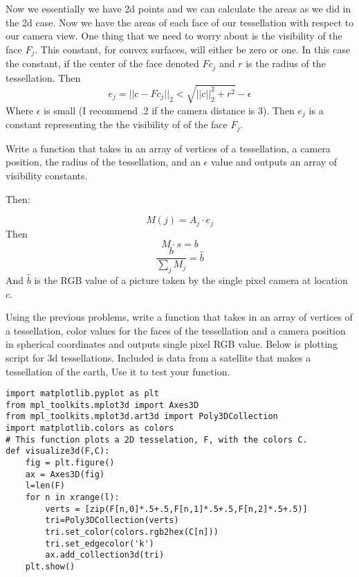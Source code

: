 Now we essentially we have 2d points and we can calculate the areas as we did in the 2d case. Now we have the areas of each face of our tessellation with respect to our camera view. One thing that we need to worry about is the visibility of the face $F_j$. This constant, for convex surfaces, will either be zero or one. In this case the constant, if the center of the face denoted $Fc_j$ and $r$ is the radius of the tessellation. Then
\[
e_j=||c-Fc_j||_2<\sqrt{||c||_2^2+r^2}-\epsilon
\] 
Where $\epsilon$ is small (I recommend .2 if the camera distance is 3).
Then $e_j$ is a constant representing the  the visibility of of the face $F_j$.

\begin{problem}
Write a function that takes in an array of vertices of a tessellation, a camera position, the radius of the tessellation, and an $\epsilon$ value and outputs an array of visibility constants.
\end{problem}
Then:

\begin{equation}
M(j) = A_j \cdot e_j
\end{equation}
Then
\begin{equation}
M \cdot s = b
\end{equation}
\begin{equation}
\frac{b}{\sum_j M_j} = \hat{b}
\end{equation}
And $\hat{b}$ is the RGB value of a picture taken by the single pixel camera at location $c$.

\begin{problem}
Using the previous problems, write a function that takes in an array of vertices of a tessellation, color values for the faces of the tessellation and a camera position in spherical coordinates and outputs single pixel RGB value. Below is plotting script for 3d tessellations. Included is data from a satellite that makes a tessellation of the earth, Use it to test your function.
\end{problem}

\begin{lstlisting}
import matplotlib.pyplot as plt
from mpl_toolkits.mplot3d import Axes3D
from mpl_toolkits.mplot3d.art3d import Poly3DCollection
import matplotlib.colors as colors
# This function plots a 2D tesselation, F, with the colors C. 
def visualize3d(F,C):
    fig = plt.figure()
    ax = Axes3D(fig)
    l=len(F)
    for n in xrange(l):
        verts = [zip(F[n,0]*.5+.5,F[n,1]*.5+.5,F[n,2]*.5+.5)]
        tri=Poly3DCollection(verts)
        tri.set_color(colors.rgb2hex(C[n]))
        tri.set_edgecolor('k')
        ax.add_collection3d(tri)
    plt.show()
\end{lstlisting}


